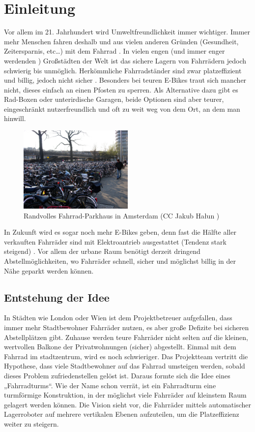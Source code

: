 \section{Einleitung}
Vor allem im 21. Jahrhundert wird Umweltfreundlichkeit immer wichtiger. Immer mehr Menschen fahren deshalb und aus vielen anderen Gründen (Gesundheit, Zeitersparnis, etc…) mit dem Fahrrad \cite{}. In vielen engen (und immer enger werdenden \cite{}) Großstädten der Welt ist das sichere Lagern von Fahrrädern jedoch schwierig bis unmöglich. Herkömmliche Fahrradständer sind zwar platzeffizient und billig, jedoch nicht sicher \cite{}. Besonders bei teuren E-Bikes traut sich mancher nicht, dieses einfach an einen Pfosten zu sperren. Als Alternative dazu gibt es Rad-Boxen oder unterirdische Garagen, beide Optionen sind aber teurer, eingeschränkt nutzerfreundlich und oft zu weit weg von dem Ort, an dem man hinwill.

\begin{figure}[ht]
  \centering
  \includegraphics[width=0.5\textwidth]{images/fahrrad_parkhaus_voll}
  \caption{Randvolles Fahrrad-Parkhaus in Amsterdam (CC Jakub Hałun \cite{cc})}
  \label{fig:fahrrad_parkhaus_voll}
\end{figure}

In Zukunft wird es sogar noch mehr E-Bikes geben, denn fast die Hälfte aller verkauften Fahrräder sind mit Elektroantrieb ausgestattet (Tendenz stark steigend) \cite{}. Vor allem der urbane Raum benötigt derzeit dringend Abstellmöglichkeiten, wo Fahrräder schnell, sicher und möglichst billig in der Nähe geparkt werden können.

\subsection{Entstehung der Idee}

In Städten wie London oder Wien ist dem Projektbetreuer aufgefallen, dass immer mehr Stadtbewohner Fahrräder nutzen, es aber große Defizite bei sicheren Abstellplätzen gibt. Zuhause werden teure Fahrräder nicht selten auf die kleinen, wertvollen Balkone der Privatwohnungen (sicher) abgestellt. Einmal mit dem Fahrrad im stadtzentrum, wird es noch schwieriger. Das Projektteam vertritt die Hypothese, dass viele Stadtbewohner auf das Fahrrad umsteigen werden, sobald dieses Problem zufriedenstellen gelöst ist. Daraus formte sich die Idee eines „Fahrradturms“. Wie der Name schon verrät, ist ein Fahrradturm eine turmförmige Konstruktion, in der möglichst viele Fahrräder auf kleinstem Raum gelagert werden können. Die Vision sieht vor, die Fahrräder mittels automatischer Lagerroboter auf mehrere vertikalen Ebenen aufzuteilen, um die Platzeffizienz weiter zu steigern.

